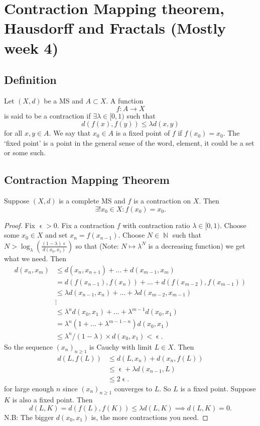 \documentclass{article}
\DeclareMathOperator\eps{\epsilon}
\DeclareMathOperator\N{\mathbb{N}}
\newcommand{\seq}{(x_n)_{n \geq 1}}
\begin{document}
\section*{Contraction Mapping theorem, Hausdorff and Fractals (Mostly week 4)}
\subsection*{Definition}
Let $(X,d)$ be a MS and $A \subset X$. A function $$
f: A \to X
$$
is said to be a contraction if $\exists \lambda \in [0,1)$ such that $$
d(f(x),f(y)) \leq \lambda d(x,y)
$$
for all $x,y \in A$. We say that
$x_0 \in A$ is a fixed point of $f$ if $f(x_0) = x_0$. The `fixed point' is a point in the general sense of the word, element, it could be a set or some such.
\subsection*{Contraction Mapping Theorem}
Suppose $(X,d)$ is a complete MS and $f$ is a contraction on $X$. Then $$
\exists! x_0 \in X: f(x_0) = x_0.
$$
\begin{proof}
Fix $\eps>0$.
Fix a contraction $f$ with contraction ratio $\lambda \in [0,1)$.
Choose some $x_0 \in X$ and set $x_n = f(x_{n-1})$. Choose $N \in \N$
such that $N > \log_{\lambda} \left( \frac{(1-\lambda)\eps}{d(x_0,x_1)} \right)$ so that (Note: $N \mapsto \lambda^N$ is a decreasing function) we get what we need.
Then \begin{align*}
d(x_n,x_m) &\leq d(x_n,x_{n+1}) + \hdots + d(x_{m-1},x_m) \\
&= d(f(x_{n-1}),f(x_n)) + \hdots + d(f(x_{m-2}),f(x_{m-1})) \\
& \leq \lambda d(x_{n-1},x_n) + \hdots + \lambda d(x_{m-2},x_{m-1}) \\
&\vdots \\
&\leq \lambda^n d(x_0,x_1) + \hdots + \lambda^{m-1}d(x_0,x_1) \\
&= \lambda^n(1+\hdots+\lambda^{m-1-n})d(x_0,x_1) \\
& \leq \lambda^n \slash (1 - \lambda) \times d(x_0,x_1)
< \eps.
\end{align*}
So the sequence $\seq$ is Cauchy with limit $L \in X$. Then \begin{align*}
d(L,f(L)) &\leq d(L,x_n) + d(x_n,f(L)) \\
&\leq \eps + \lambda d(x_{n-1},L) \\
& \leq 2 \eps.
\end{align*}
for large enough $n$ since $\seq$ converges to $L$. So $L$ is a fixed point. Suppose $K$ is also a fixed point. Then $$
d(L,K) = d(f(L),f(K)) \leq \lambda d(L,K) \implies d(L,K) = 0.
$$
N.B: The bigger $d(x_0,x_1)$ is, the more contractions you need.
\end{proof}
\end{document}
